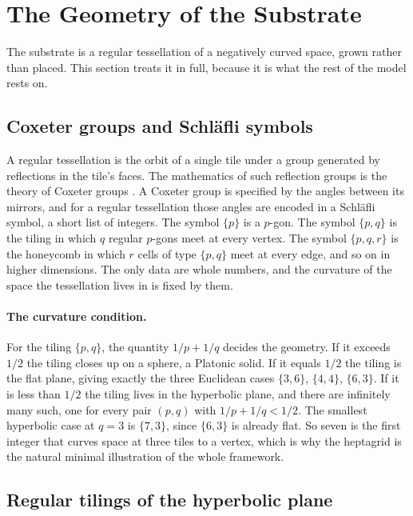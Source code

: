 \section{The Geometry of the Substrate}
\label{sec:geometry}

The substrate is a regular tessellation of a negatively curved space, grown rather than placed.
This section treats it in full, because it is what the rest of the model rests on.

\subsection{Coxeter groups and Schl\"afli symbols}

A regular tessellation is the orbit of a single tile under a group generated by reflections in the
tile's faces. The mathematics of such reflection groups is the theory of Coxeter groups \citep{coxeter1973regular}. A Coxeter group is specified by the angles between its mirrors, and for a regular tessellation
those angles are encoded in a Schl\"afli symbol, a short list of integers. The symbol $\{p\}$ is a
$p$-gon. The symbol $\{p,q\}$ is the tiling in which $q$ regular $p$-gons meet at every vertex. The
symbol $\{p,q,r\}$ is the honeycomb in which $r$ cells of type $\{p,q\}$ meet at every edge, and so
on in higher dimensions. The only data are whole numbers, and the curvature of the space the
tessellation lives in is fixed by them.

\paragraph{The curvature condition.}
For the tiling $\{p,q\}$, the quantity $1/p + 1/q$ decides the geometry. If it exceeds $1/2$ the
tiling closes up on a sphere, a Platonic solid. If it equals $1/2$ the tiling is the flat plane,
giving exactly the three Euclidean cases $\{3,6\}$, $\{4,4\}$, $\{6,3\}$. If it is less than $1/2$
the tiling lives in the hyperbolic plane, and there are infinitely many such, one for every pair
$(p,q)$ with $1/p + 1/q < 1/2$. The smallest hyperbolic case at $q = 3$ is $\{7,3\}$, since $\{6,3\}$
is already flat. So seven is the first integer that curves space at three tiles to a vertex, which
is why the heptagrid is the natural minimal illustration of the whole framework.

\subsection{Regular tilings of the hyperbolic plane}

